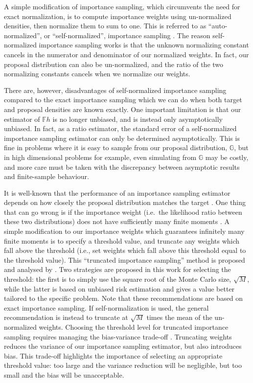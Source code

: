 \documentclass[11pt, oneside]{article}   	%
\newcommand{\bF}{\mathbb{F}}
\newcommand{\bG}{\mathbb{G}}
\begin{document}
A simple modification of importance sampling, which circumvents the need for exact normalization, is to compute importance weights using un-normalized densities, then normalize them to sum to one. This is referred to as ``auto-normalized'', or ``self-normalized'', importance sampling \citep[see, e.g.,][]{Elv22}. The reason self-normalized importance sampling works is that the unknown normalizing constant cancels in the numerator and denominator of our normalized weights. In fact, our proposal distribution can also be un-normalized, and the ratio of the two normalizing constants cancels when we normalize our weights.

There are, however, disadvantages of self-normalized importance sampling compared to the exact importance sampling which we can do when both target and proposal densities are known exactly. One important limitation is that our estimator of $\bF h$ is no longer unbiased, and is instead only asymptotically unbiased. In fact, as a ratio estimator, the standard error of a self-normalized importance sampling estimator can only be determined asymptotically. This is fine in problems where it is easy to sample from our proposal distribution, $\bG$, but in high dimensional problems for example, even simulating from $\bG$ may be costly, and more care must be taken with the discrepancy between asymptotic results and finite-sample behaviour.

It is well-known that the performance of an importance sampling estimator depends on how closely the proposal distribution matches the target \citep{Rob04}. One thing that can go wrong is if the importance weight (i.e.\ the likelihood ratio between these two distributions) does not have sufficiently many finite moments \citep{Aga17}. A simple modification to our importance weights which guarantees infinitely many finite moments is to specify a threshold value, and truncate any weights which fall above the threshold (i.e., set weights which fall above this threshold equal to the threshold value). This ``truncated importance sampling'' method is proposed and analysed by \citet{Ion08}. Two strategies are proposed in this work for selecting the threshold: the first is to simply use the square root of the Monte Carlo size, $\sqrt{M}$, while the latter is based on unbiased risk estimation and gives a value better tailored to the specific problem. Note that these recommendations are based on exact importance sampling. If self-normalization is used, the general recommendation is instead to truncate at $\sqrt{M}$ times the mean of the un-normalized weights. Choosing the threshold level for truncated importance sampling requires managing the bias-variance trade-off \citep{Has09}. Truncating weights reduces the variance of our importance sampling estimator, but also introduces bias. This trade-off highlights the importance of selecting an appropriate threshold value: too large and the variance reduction will be negligible, but too small and the bias will be unacceptable.
\end{document}
